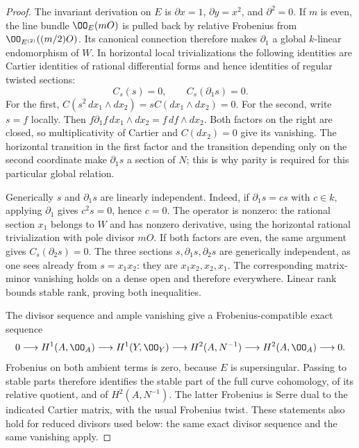 \begin{proof}
The invariant derivation on $E$ is
$\partial x=1$, $\partial y=x^2$, and $\partial^2=0$.
If $m$ is even, the line bundle $\OO_E(mO)$ is pulled back by
relative Frobenius from $\OO_{E^{(2)}}((m/2)O)$.  Its canonical
connection therefore makes $\partial_1$ a global $k$-linear
endomorphism of $W$.  In horizontal local trivializations the
following identities are Cartier identities of rational differential
forms and hence identities of regular twisted sections:
\[
                  C_s(s)=0,\qquad C_s(\partial_1s)=0.
\]
For the first, $C(s^2\,dx_1\wedge dx_2)=sC(dx_1\wedge dx_2)=0$.
For the second, write $s=f$ locally.  Then
$f\partial_1f\,dx_1\wedge dx_2=f\,df\wedge dx_2$.
Both factors on the right are closed, so multiplicativity of Cartier
and $C(dx_2)=0$ give its vanishing.  The horizontal transition in
the first factor and the transition depending only on the second
coordinate make $\partial_1s$ a section of $N$; this is why parity
is required for this particular global relation.

Generically $s$ and $\partial_1s$ are linearly independent.
Indeed, if $\partial_1s=cs$ with $c\in k$, applying $\partial_1$
gives $c^2s=0$, hence $c=0$.  The operator is nonzero: the rational
section $x_1$ belongs to $W$ and has nonzero derivative, using the
horizontal rational trivialization with pole divisor $mO$.
If both factors are even, the same argument gives
$C_s(\partial_2s)=0$.  The three sections
$s,\partial_1s,\partial_2s$ are generically independent, as one sees
already from $s=x_1x_2$: they are $x_1x_2,x_2,x_1$.
The corresponding matrix-minor vanishing holds on a dense open and
therefore everywhere.  Linear rank bounds stable rank, proving both
inequalities.

The divisor sequence and ample vanishing give a Frobenius-compatible
exact sequence
\[
0\longrightarrow H^1(A,\OO_A)\longrightarrow H^1(Y,\OO_Y)
 \longrightarrow H^2(A,N^{-1})\longrightarrow H^2(A,\OO_A)
 \longrightarrow0.
\]
Frobenius on both ambient terms is zero, because $E$ is supersingular.
Passing to stable parts therefore identifies the stable part of the
full curve cohomology, of its relative quotient, and of
$H^2(A,N^{-1})$.  The latter Frobenius is Serre dual to the indicated
Cartier matrix, with the usual Frobenius twist.  These statements also
hold for reduced divisors used below: the same exact divisor sequence
and the same vanishing apply.
\end{proof}


